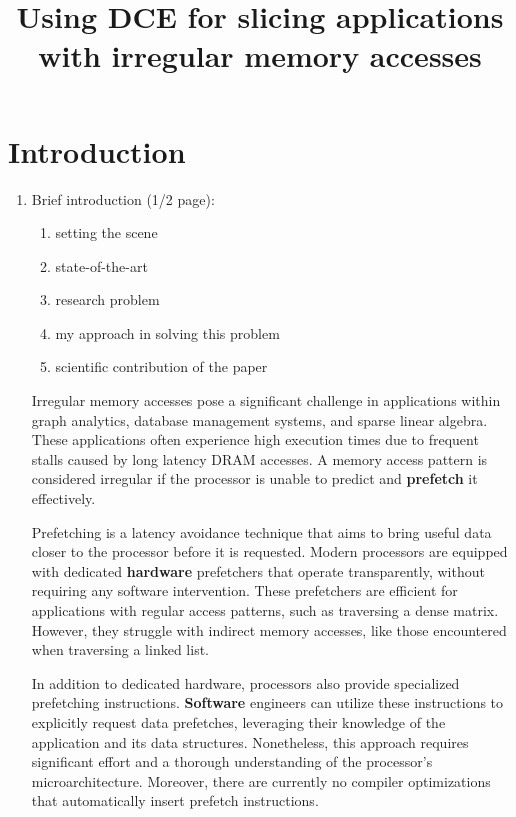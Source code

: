 \documentclass{acaces}
\begin{document}
\title{Using DCE for slicing applications with irregular memory accesses}

\pagestyle{empty}

\begin{abstract}

\end{abstract}


\section{Introduction}

\begin{enumerate}
\item Brief introduction (1/2 page):
\begin{enumerate}
\item setting the scene
\item state-of-the-art
\item research problem
\item my approach in solving this problem
\item scientific contribution of the paper
\end{enumerate}

Irregular memory accesses pose a significant challenge in applications within graph analytics, database management systems, and sparse linear algebra.
These applications often experience high execution times due to frequent stalls caused by long latency DRAM accesses.
A memory access pattern is considered irregular if the processor is unable to predict and \textbf{prefetch} it effectively.

Prefetching is a latency avoidance technique that aims to bring useful data closer to the processor before it is requested.
Modern processors are equipped with dedicated \textbf{hardware} prefetchers that operate transparently, without requiring any software intervention.
These prefetchers are efficient for applications with regular access patterns, such as traversing a dense matrix.
However, they struggle with indirect memory accesses, like those encountered when traversing a linked list.

In addition to dedicated hardware, processors also provide specialized prefetching instructions.
\textbf{Software} engineers can utilize these instructions to explicitly request data prefetches, leveraging their knowledge of the application and its data structures.
Nonetheless, this approach requires significant effort and a thorough understanding of the processor's microarchitecture.
Moreover, there are currently no compiler optimizations that automatically insert prefetch instructions.


\end{enumerate}
\end{document}
